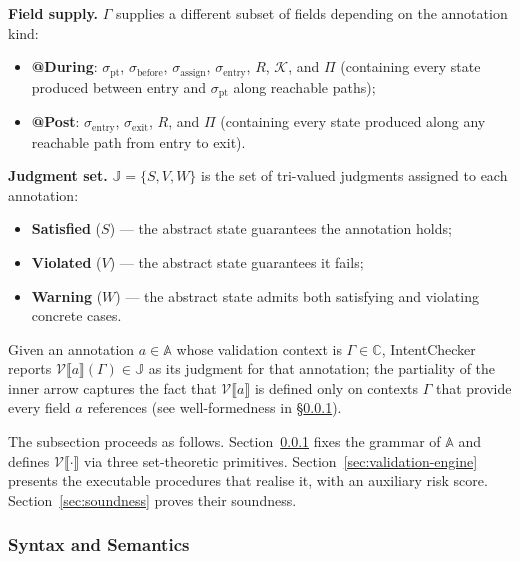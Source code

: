 \documentclass[pdflatex,sn-basic]{sn-jnl}%
\theoremstyle{thmstyleone}%
\theoremstyle{thmstyletwo}%
\theoremstyle{thmstylethree}%
\begin{document}
\smallskip
\noindent\textbf{Field supply.}
$\Gamma$ supplies a different subset of fields depending on the annotation kind:
\begin{itemize}
    \item \textbf{@During}: $\sigma_{\text{pt}}$, $\sigma_{\text{before}}$, $\sigma_{\text{assign}}$, $\sigma_{\text{entry}}$, $R$, $\mathcal{K}$, and $\Pi$ (containing every state produced between entry and $\sigma_{\text{pt}}$ along reachable paths);
    \item \textbf{@Post}: $\sigma_{\text{entry}}$, $\sigma_{\text{exit}}$, $R$, and $\Pi$ (containing every state produced along any reachable path from entry to exit).
\end{itemize}

\smallskip
\noindent\textbf{Judgment set.}
$\mathbb{J} = \{S, V, W\}$ is the set of tri-valued judgments assigned to each annotation:
\begin{itemize}
    \item \textbf{Satisfied} ($S$) --- the abstract state guarantees the annotation holds;
    \item \textbf{Violated} ($V$) --- the abstract state guarantees it fails;
    \item \textbf{Warning} ($W$) --- the abstract state admits both satisfying and violating concrete cases.
\end{itemize}
Given an annotation $a \in \mathbb{A}$ whose validation context is $\Gamma \in \mathbb{C}$, IntentChecker reports $\mathcal{V}\llbracket a \rrbracket(\Gamma) \in \mathbb{J}$ as its judgment for that annotation; the partiality of the inner arrow captures the fact that $\mathcal{V}\llbracket a \rrbracket$ is defined only on contexts $\Gamma$ that provide every field $a$ references (see well-formedness in §\ref{sec:intent-semantics}).

The subsection proceeds as follows.
Section~\ref{sec:intent-semantics} fixes the grammar of $\mathbb{A}$ and defines $\mathcal{V}\llbracket \cdot \rrbracket$ via three set-theoretic primitives.
Section~\ref{sec:validation-engine} presents the executable procedures that realise it, with an auxiliary risk score.
Section~\ref{sec:soundness} proves their soundness.

\subsubsection{Syntax and Semantics}\label{sec:intent-semantics}
\end{document}
